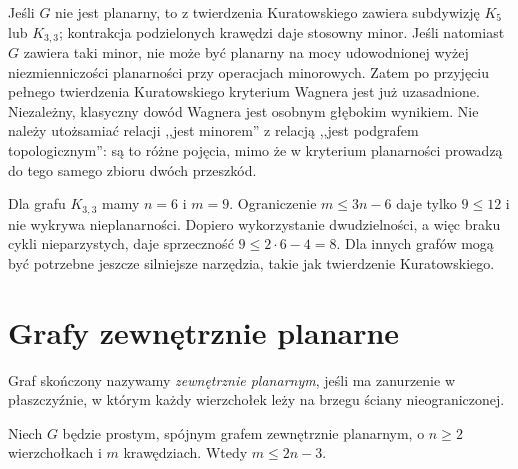 \begin{uwaga}
Jeśli $G$ nie jest planarny, to z twierdzenia Kuratowskiego
zawiera subdywizję $K_5$ lub $K_{3,3}$; kontrakcja
podzielonych krawędzi daje stosowny minor.
Jeśli natomiast $G$ zawiera taki minor, nie może być
planarny na mocy udowodnionej wyżej niezmienniczości
planarności przy operacjach minorowych.
Zatem po przyjęciu pełnego twierdzenia Kuratowskiego
kryterium Wagnera jest już uzasadnione. Niezależny,
klasyczny dowód Wagnera jest osobnym głębokim wynikiem. Nie należy utożsamiać relacji
,,jest minorem'' z relacją ,,jest podgrafem topologicznym'':
są to różne pojęcia, mimo że w kryterium planarności
prowadzą do tego samego zbioru dwóch przeszkód.
\end{uwaga}

\begin{przyklad}
Dla grafu $K_{3,3}$ mamy $n=6$ i $m=9$.
Ograniczenie $m\le3n-6$ daje tylko $9\le12$ i nie wykrywa
nieplanarności. Dopiero wykorzystanie dwudzielności,
a więc braku cykli nieparzystych, daje sprzeczność
$9\le2\cdot6-4=8$. Dla innych grafów mogą być potrzebne
jeszcze silniejsze narzędzia, takie jak twierdzenie Kuratowskiego.
\end{przyklad}

\section{Grafy zewnętrznie planarne}
\label{sec:tg-outerplanar}

\begin{definicja}
Graf skończony nazywamy \emph{zewnętrznie planarnym}, jeśli
ma zanurzenie w płaszczyźnie, w którym każdy wierzchołek
leży na brzegu ściany nieograniczonej.
\end{definicja}

\begin{twierdzenie}
Niech $G$ będzie prostym, spójnym grafem zewnętrznie planarnym,
o $n\ge2$ wierzchołkach i $m$ krawędziach. Wtedy
$m\le2n-3$.
\end{twierdzenie}

